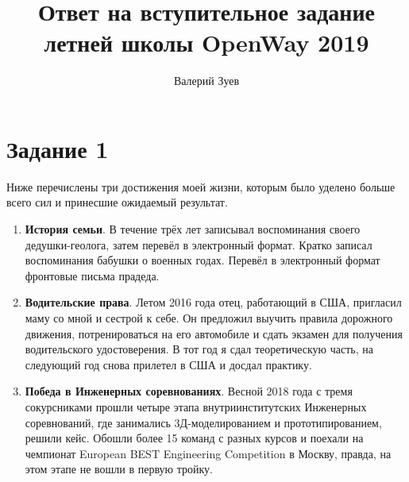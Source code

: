 \documentclass[a4paper,12pt]{article} %
\begin{document}
\author{Валерий Зуев} %
\title{Ответ на вступительное задание летней школы OpenWay 2019}
\maketitle

\section{Задание 1}
Ниже перечислены три достижения моей жизни, которым было уделено больше всего сил и принесшие ожидаемый результат.
\begin{enumerate}
	\item \textbf{История семьи}. В течение трёх лет записывал воспоминания своего дедушки-геолога, затем перевёл в электронный формат. Кратко записал воспоминания бабушки о военных годах. Перевёл в электронный формат фронтовые письма прадеда.
	\item \textbf{Водительские права}. Летом 2016 года отец, работающий в США, пригласил маму со мной и сестрой к себе. Он предложил выучить правила дорожного движения, потренироваться на его автомобиле и сдать экзамен для получения водительского удостоверения. В тот год я сдал теоретическую часть, на следующий год снова прилетел в США и досдал практику.
	\item \textbf{Победа в Инженерных соревнованиях}. Весной 2018 года с тремя сокурсниками прошли четыре этапа внутриинститутских Инженерных соревнований, где занимались 3Д-моделированием и прототипированием, решили кейс. Обошли более 15 команд с разных курсов и поехали на чемпионат European BEST Engineering Competition в Москву, правда, на этом этапе не вошли в первую тройку.
\end{enumerate}
\newpage
\end{document}
